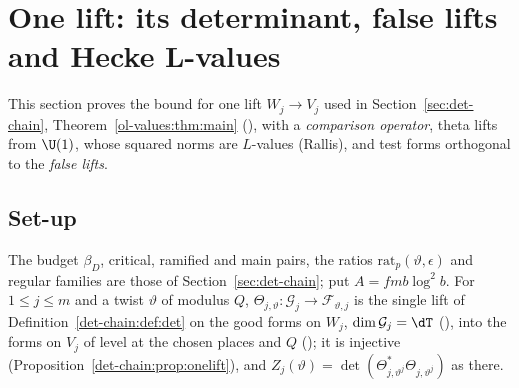 \section{One lift: its determinant, false lifts and Hecke L-values}\label{sec:ol-values}

This section proves the bound for one lift $W_j\to V_j$ used in Section~\ref{sec:det-chain},
Theorem~\ref{ol-values:thm:main} (),
with a \emph{comparison operator}, theta lifts from $\U(1)$, whose squared norms are $L$-values
(Rallis), and test forms orthogonal to the \emph{false lifts}.

\subsection{Set-up}\label{ol-values:sec:setup}

The budget $\beta_D$, critical, ramified and main pairs, the ratios $\mathrm{rat}_p(\vartheta,\epsilon)$
and regular families are those of Section~\ref{sec:det-chain}; put $A=fmb\log^2b$. For $1\le j\le m$
and a twist $\vartheta$ of modulus $Q$, $\Theta_{j,\vartheta}\colon\mathcal G_j\to\mathcal F_{\vartheta,j}$
is the single lift of Definition~\ref{det-chain:def:det} on the good forms on $W_j$,
$\dim\mathcal G_j=\dT$ (), into the forms on
$V_j$ of level at the chosen places and $Q$ (); it is injective
(Proposition~\ref{det-chain:prop:onelift}), and
$Z_j(\vartheta)=\det(\Theta^*_{j,\vartheta^j}\Theta_{j,\vartheta^j})$ as there.

